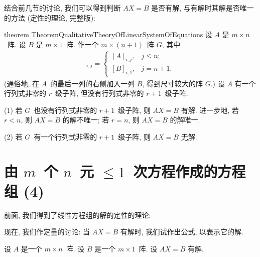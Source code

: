 结合前几节的讨论, 我们可以得到判断
\(AX = B\) 是否有解,
与有解时其解是否唯一的方法
(定性的理论, 完整版):

\begin{restatable}[]{theorem}%
    {TheoremQualitativeTheoryOfLinearSystemOfEquations}
    设 \(A\) 是 \(m \times n\)~阵.
    设 \(B\) 是 \(m \times 1\)~阵.
    作一个 \(m \times (n+1)\)~阵 \(G\),
    其中
    \begin{align*}
        [G]_{i,j}
        = \begin{cases}
              [A]_{i,j}, & j \leq n;  \\
              [B]_{i,1}, & j = n + 1.
          \end{cases}
    \end{align*}
    (通俗地, 在 \(A\)~的最后一列的右侧加入一列 \(B\),
    得到尺寸较大的阵 \(G\).)
    设
    \(A\) 有一个行列式非零的 \(r\)~级子阵,
    但没有行列式非零的 \(r+1\)~级子阵.

    (1)
    若 \(G\)~也没有行列式非零的 \(r+1\)~级子阵,
    则 \(AX = B\) 有解.
    进一步地, 若 \(r < n\),
    则 \(AX = B\) 的解不唯一;
    若 \(r = n\),
    则 \(AX = B\) 的解唯一.

    (2)
    若 \(G\)~有一个行列式非零的 \(r+1\)~级子阵,
    则 \(AX = B\) 无解.
\end{restatable}

\section{\texorpdfstring{由 \(m\)~个 \(n\)~元
      \({\leq} 1\)~次方程作成的方程组 (4)}%
  {由 m 个 n 元 ≤1 次方程作成的方程组 (4)}}


\maldevigalegajxo

前面, 我们得到了线性方程组的解的定性的理论:

\TheoremQualitativeTheoryOfLinearSystemOfEquations*

现在, 我们作定量的讨论:
当 \(AX = B\) 有解时,
我们试作出公式, 以表示它的解.

设 \(A\) 是一个 \(m \times n\)~阵.
设 \(B\) 是一个 \(m \times 1\)~阵.
设 \(AX = B\) 有解.

